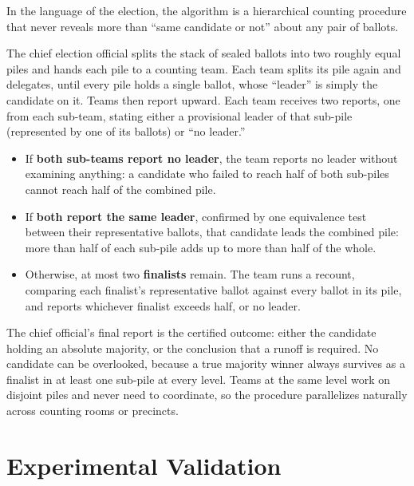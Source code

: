\documentclass[conference]{IEEEtran}
\begin{document}
In the language of the election, the algorithm is a hierarchical counting
procedure that never reveals more than ``same candidate or not'' about any
pair of ballots.

The chief election official splits the stack of sealed ballots into two
roughly equal piles and hands each pile to a counting team. Each team splits
its pile again and delegates, until every pile holds a single ballot, whose
``leader'' is simply the candidate on it. Teams then report upward. Each team
receives two reports, one from each sub-team, stating either a provisional
leader of that sub-pile (represented by one of its ballots) or ``no
leader.''
\begin{itemize}
  \item If \textbf{both sub-teams report no leader}, the team reports no
        leader without examining anything: a candidate who failed to reach
        half of both sub-piles cannot reach half of the combined pile.
  \item If \textbf{both report the same leader}, confirmed by one equivalence
        test between their representative ballots, that candidate leads the
        combined pile: more than half of each sub-pile adds up to more than
        half of the whole.
  \item Otherwise, at most two \textbf{finalists} remain. The team runs a
        recount, comparing each finalist's representative ballot against
        every ballot in its pile, and reports whichever finalist exceeds half,
        or no leader.
\end{itemize}
The chief official's final report is the certified outcome: either the
candidate holding an absolute majority, or the conclusion that a runoff is
required. No candidate can be overlooked, because a true majority winner
always survives as a finalist in at least one sub-pile at every level. Teams
at the same level work on disjoint piles and never need to coordinate, so the
procedure parallelizes naturally across counting rooms or precincts.

\section{Experimental Validation}\label{sec:experiments}
\end{document}
